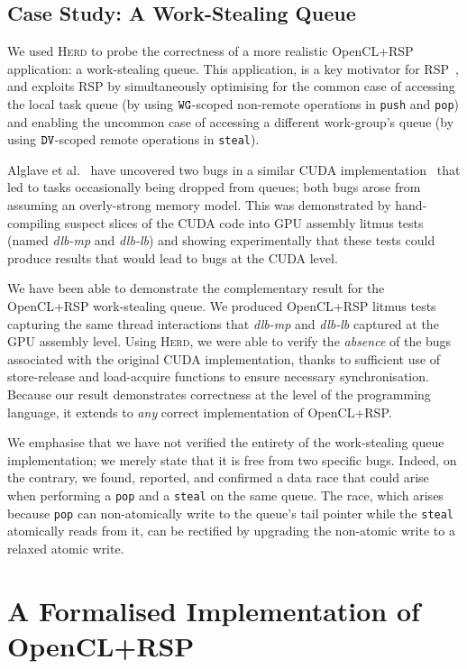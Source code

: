 \documentclass[svgnames,10pt]{sigplanconf}
\theoremstyle{definition}
\newcommand\herd{\textsc{Herd}}
\newcommand\swg{{\tt WG}}
\newcommand\sdv{{\tt DV}}
\begin{document}
\subsection{Case Study: A Work-Stealing Queue}
\label{sec:work_stealing}

We used \herd{} to probe the correctness of a more realistic
OpenCL+RSP application: a work-stealing queue. This application,
is a key motivator for RSP~\cite[\S3.2]{orr+15}, and exploits RSP by simultaneously optimising
for the common case of accessing the local task queue (by using
$\swg$-scoped non-remote operations in \texttt{push} and \texttt{pop})
and enabling the uncommon case of accessing a different work-group's
queue (by using $\sdv$-scoped remote operations in \texttt{steal}).

Alglave et al.~\cite{alglave+15} have uncovered two bugs in a similar
CUDA implementation~\cite{cederman+12} that led to tasks occasionally
being dropped from queues; both bugs arose from assuming an
overly-strong memory model. This was demonstrated by hand-compiling
suspect slices of the CUDA code into GPU assembly litmus tests (named
\emph{dlb-mp} and \emph{dlb-lb}) and showing experimentally that these
tests could produce results that would lead to bugs at the CUDA level.

We have been able to demonstrate the complementary result for the
OpenCL+RSP work-stealing queue. We produced OpenCL+RSP litmus tests
capturing the same thread interactions that \emph{dlb-mp} and
\emph{dlb-lb} captured at the GPU assembly level. Using \herd{}, we
were able to verify the \emph{absence} of the bugs associated with the
original CUDA implementation, thanks to sufficient use of
store-release and load-acquire functions to ensure necessary
synchronisation. Because our result demonstrates correctness at the
level of the programming language, it extends to \emph{any} correct
implementation of OpenCL+RSP.

We emphasise that we have not verified the entirety of the
work-stealing queue implementation; we merely state that it is free
from two specific bugs. Indeed, on the contrary, we found,
reported, and confirmed a data race that could arise when performing a \texttt{pop}
and a \texttt{steal} on the same queue. The race, which arises because
\texttt{pop} can non-atomically write to the queue's tail pointer
while the \texttt{steal} atomically reads from it, can be rectified by
upgrading the non-atomic write to a relaxed atomic write.


\section{A Formalised Implementation of OpenCL+RSP}
\label{sec:implementation}
\end{document}
